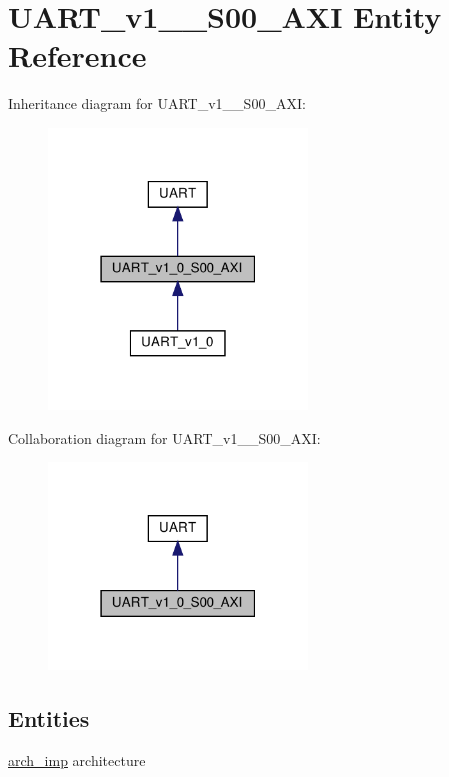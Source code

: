 \hypertarget{classUART__v1__0__S00__AXI}{}\section{U\+A\+R\+T\+\_\+v1\+\_\+\_\+\+S00\+\_\+\+A\+XI Entity Reference}
\label{classUART__v1__0__S00__AXI}


Inheritance diagram for U\+A\+R\+T\+\_\+v1\+\_\+\_\+\+S00\+\_\+\+A\+XI\+:\nopagebreak
\begin{figure}[H]
\begin{center}
\leavevmode
\includegraphics[width=195pt]{classUART__v1__0__S00__AXI__inherit__graph}
\end{center}
\end{figure}


Collaboration diagram for U\+A\+R\+T\+\_\+v1\+\_\+\_\+\+S00\+\_\+\+A\+XI\+:\nopagebreak
\begin{figure}[H]
\begin{center}
\leavevmode
\includegraphics[width=195pt]{classUART__v1__0__S00__AXI__coll__graph}
\end{center}
\end{figure}
\subsection*{Entities}
\begin{DoxyCompactItemize}
\item 
\hyperlink{classUART__v1__0__S00__AXI_1_1arch__imp}{arch\+\_\+imp} architecture
\end{DoxyCompactItemize}
